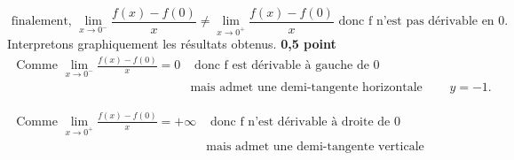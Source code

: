 \documentclass[12pt]{article}
\begin{document}
\begin{enumerate}
\begin{enumerate}
\[\text{ finalement, }\lim_{x \to 0^{-}} \frac{f(x)-f(0)}{x}\neq\lim_{x \to 0^{+}} \frac{f(x)-f(0)}{x} \text{ donc f n'est pas dérivable en 0.}\] 
	Interpretons  graphiquement les résultats obtenus. \textbf{ 0,5 point}
\begin{align*}
\text{ Comme }\lim_{x \to 0^{-}} \frac{f(x)-f(0)}{x}=0&\text{ donc f est dérivable à gauche de 0}\\ 
													&\text{mais admet une demi-tangente horizontale d'équation }y=-1.
\end{align*}

\begin{align*}
\text{ Comme }\lim_{x \to 0^{+}} \frac{f(x)-f(0)}{x}=+\infty & \text{ donc f n'est dérivable à droite de 0}\\ 
													&\text{mais admet une demi-tangente verticale orientée vers le haut. }
\end{align*}
\end{enumerate}
\end{enumerate}
\end{document}
